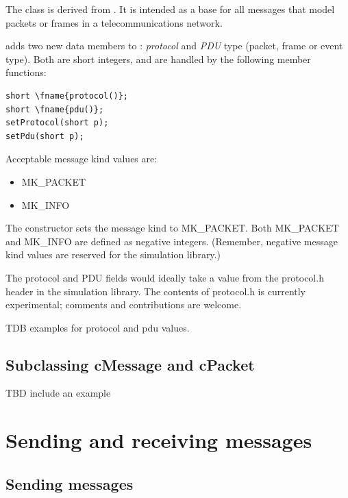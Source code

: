 The  class is derived from . It is intended as 
a base for all messages that model packets or frames in a telecommunications 
network.

 adds two new data members to :
\textit{protocol} and \textit{PDU} type (packet, frame or event type).
Both are short integers, and are handled by the following member
functions:

\begin{Verbatim}[commandchars=\\\{\}]
short \fname{protocol()};
short \fname{pdu()};
setProtocol(short p);
setPdu(short p);
\end{Verbatim}

Acceptable message kind values are:
\begin{itemize}
\item{MK\_PACKET}
\item{MK\_INFO}
\end{itemize}

The  constructor sets the message kind to MK\_PACKET. Both MK\_PACKET 
and MK\_INFO are defined as negative integers. (Remember, negative 
message kind values are reserved for the simulation library.)

The protocol and PDU fields would ideally take a value from the protocol.h 
header in the simulation library. The contents of protocol.h 
is currently experimental; comments and contributions are welcome.

TDB examples for protocol and pdu values.





\subsection{Subclassing cMessage and cPacket}

TBD include an example





\section{Sending and receiving messages}

\subsection{Sending messages}

